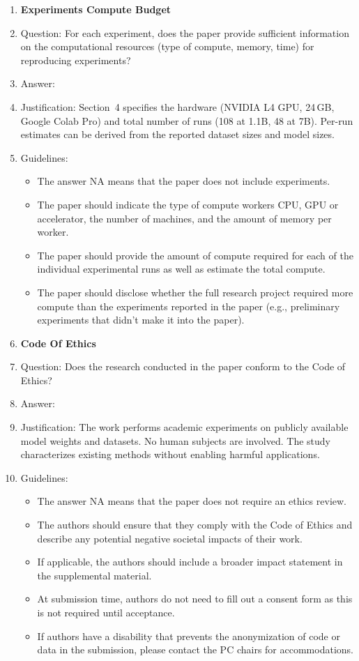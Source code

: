 \documentclass{article}
\begin{document}
\begin{enumerate}
\item {\bf Experiments Compute Budget}
\item[] Question: For each experiment, does the paper provide sufficient information on the computational resources (type of compute, memory, time) for reproducing experiments?
\item[] Answer: \answerYes{}
\item[] Justification: Section~4 specifies the hardware (NVIDIA L4 GPU, 24\,GB, Google Colab Pro) and total number of runs (108 at 1.1B, 48 at 7B). Per-run estimates can be derived from the reported dataset sizes and model sizes.
\item[] Guidelines:
\begin{itemize}
    \item The answer NA means that the paper does not include experiments.
    \item The paper should indicate the type of compute workers CPU, GPU or accelerator, the number of machines, and the amount of memory per worker.
    \item The paper should provide the amount of compute required for each of the individual experimental runs as well as estimate the total compute.
    \item The paper should disclose whether the full research project required more compute than the experiments reported in the paper (e.g., preliminary experiments that didn't make it into the paper).
\end{itemize}

\item {\bf Code Of Ethics}
\item[] Question: Does the research conducted in the paper conform to the Code of Ethics?
\item[] Answer: \answerYes{}
\item[] Justification: The work performs academic experiments on publicly available model weights and datasets. No human subjects are involved. The study characterizes existing methods without enabling harmful applications.
\item[] Guidelines:
\begin{itemize}
    \item The answer NA means that the paper does not require an ethics review.
    \item The authors should ensure that they comply with the Code of Ethics and describe any potential negative societal impacts of their work.
    \item If applicable, the authors should include a broader impact statement in the supplemental material.
    \item At submission time, authors do not need to fill out a consent form as this is not required until acceptance.
    \item If authors have a disability that prevents the anonymization of code or data in the submission, please contact the PC chairs for accommodations.
\end{itemize}


\end{enumerate}
\end{document}
